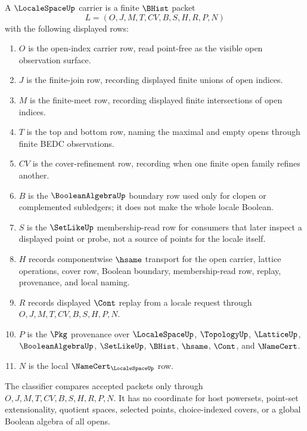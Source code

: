 \begin{definition}
\label{def:locale-space-carrier}
A $\LocaleSpaceUp$ carrier is a finite $\BHist$ packet
$$
L=(O,J,M,T,CV,B,S,H,R,P,N)
$$
with the following displayed rows:
\begin{enumerate}
\item $O$ is the open-index carrier row, read point-free as the visible open observation surface.
\item $J$ is the finite-join row, recording displayed finite unions of open indices.
\item $M$ is the finite-meet row, recording displayed finite intersections of open indices.
\item $T$ is the top and bottom row, naming the maximal and empty opens through finite BEDC observations.
\item $CV$ is the cover-refinement row, recording when one finite open family refines another.
\item $B$ is the $\BooleanAlgebraUp$ boundary row used only for clopen or complemented subledgers; it does not make the whole locale Boolean.
\item $S$ is the $\SetLikeUp$ membership-read row for consumers that later inspect a displayed point or probe, not a source of points for the locale itself.
\item $H$ records componentwise $\hsame$ transport for the open carrier, lattice operations, cover row, Boolean boundary, membership-read row, replay, provenance, and local naming.
\item $R$ records displayed $\Cont$ replay from a locale request through $O,J,M,T,CV,B,S,H,P,N$.
\item $P$ is the $\Pkg$ provenance over $\LocaleSpaceUp$, $\TopologyUp$, $\LatticeUp$, $\BooleanAlgebraUp$, $\SetLikeUp$, $\BHist$, $\hsame$, $\Cont$, and $\NameCert$.
\item $N$ is the local $\NameCert_{\LocaleSpaceUp}$ row.
\end{enumerate}
The classifier compares accepted packets only through $O,J,M,T,CV,B,S,H,R,P,N$. It has no coordinate for host powersets, point-set extensionality, quotient spaces, selected points, choice-indexed covers, or a global Boolean algebra of all opens.
\end{definition}

